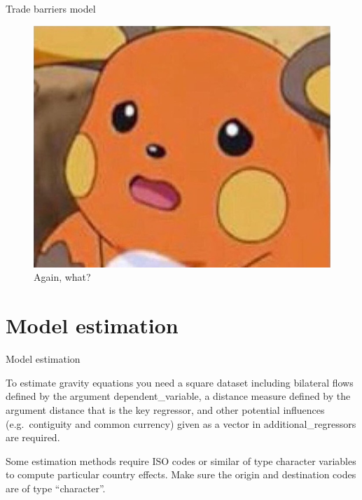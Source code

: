 \documentclass[ignorenonframetext,compress,aspectratio=169]{beamer}
\begin{document}
\begin{frame}{Trade barriers model}

\begin{figure}
\centering
\includegraphics{raichu.jpg}
\caption{Again, what?}
\end{figure}

\end{frame}

\section{Model estimation}\label{model-estimation}

\begin{frame}{Model estimation}

To estimate gravity equations you need a square dataset including
bilateral flows defined by the argument dependent\_variable, a distance
measure defined by the argument distance that is the key regressor, and
other potential influences (e.g.~contiguity and common currency) given
as a vector in additional\_regressors are required.

Some estimation methods require ISO codes or similar of type character
variables to compute particular country effects. Make sure the origin
and destination codes are of type ``character''.

\end{frame}
\end{document}
